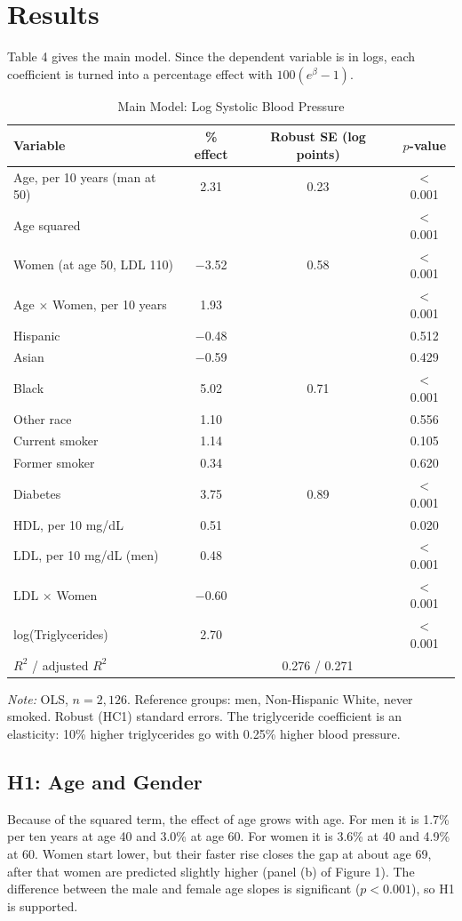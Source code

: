 \documentclass[preprint,letterpaper,11pt,authoryear]{elsarticle}
\newenvironment{tablenotes}{\par\vspace{3pt}\begin{minipage}{0.95\linewidth}\footnotesize\textit{Note:} }{\end{minipage}}
\begin{document}
\section{Results}
Table 4 gives the main model. Since the dependent variable is in logs, each coefficient is turned into a percentage effect with $100(e^{\beta}-1)$.

\begin{table}[!htbp]
\centering\small\setlength{\tabcolsep}{4pt}
\caption{Main Model: Log Systolic Blood Pressure}
\begin{tabular}{lccc}
\toprule
Variable & \% effect & Robust SE (log points) & $p$-value \\
\midrule
Age, per 10 years (man at 50) & 2.31 & 0.23 & $<$ 0.001 \\
Age squared & & & $<$ 0.001 \\
Women (at age 50, LDL 110) & $-$3.52 & 0.58 & $<$ 0.001 \\
Age $\times$ Women, per 10 years & 1.93 & & $<$ 0.001 \\
Hispanic & $-$0.48 & & 0.512 \\
Asian & $-$0.59 & & 0.429 \\
Black & 5.02 & 0.71 & $<$ 0.001 \\
Other race & 1.10 & & 0.556 \\
Current smoker & 1.14 & & 0.105 \\
Former smoker & 0.34 & & 0.620 \\
Diabetes & 3.75 & 0.89 & $<$ 0.001 \\
HDL, per 10 mg/dL & 0.51 & & 0.020 \\
LDL, per 10 mg/dL (men) & 0.48 & & $<$ 0.001 \\
LDL $\times$ Women & $-$0.60 & & $<$ 0.001 \\
log(Triglycerides) & 2.70 & & $<$ 0.001 \\
\midrule
$R^2$ / adjusted $R^2$ & \multicolumn{3}{c}{0.276 / 0.271} \\
\bottomrule
\end{tabular}
\begin{tablenotes}
OLS, $n = 2{,}126$. Reference groups: men, Non-Hispanic White, never smoked. Robust (HC1) standard errors. The triglyceride coefficient is an elasticity: 10\% higher triglycerides go with 0.25\% higher blood pressure.
\end{tablenotes}
\end{table}

\subsection{H1: Age and Gender}
Because of the squared term, the effect of age grows with age. For men it is 1.7\% per ten years at age 40 and 3.0\% at age 60. For women it is 3.6\% at 40 and 4.9\% at 60. Women start lower, but their faster rise closes the gap at about age 69, after that women are predicted slightly higher (panel (b) of Figure 1). The difference between the male and female age slopes is significant ($p < 0.001$), so H1 is supported.
\end{document}
